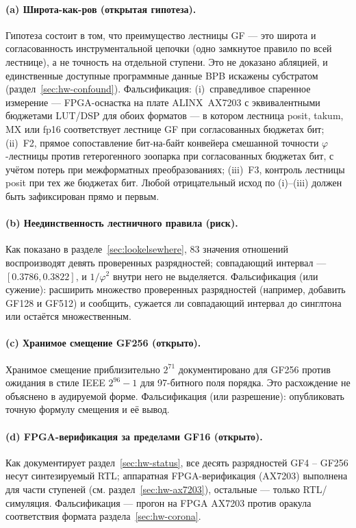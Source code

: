 \documentclass[11pt,a4paper]{article}
\theoremstyle{plain}
\begin{document}
\paragraph{(a) Широта-как-ров (открытая гипотеза).}
Гипотеза состоит в том, что преимущество лестницы GF --- это широта и
согласованность инструментальной цепочки (одно замкнутое правило по всей
лестнице), а не точность на отдельной ступени. Это не доказано абляцией, и
единственные доступные программные данные BPB искажены субстратом
(раздел~\ref{sec:hw-confound}). Фальсификация:
(i)~справедливое спаренное измерение ---
FPGA-оснастка на плате ALINX~AX7203 с эквивалентными бюджетами LUT/DSP для обоих форматов --- в котором
лестница posit, takum, MX или fp16 соответствует лестнице GF при согласованных
бюджетах бит;
(ii)~F2, прямое сопоставление бит-на-байт конвейера смешанной точности
\(\varphi\)-лестницы против гетерогенного зоопарка при согласованных бюджетах
бит, с учётом потерь при межформатных преобразованиях;
(iii)~F3, контроль лестницы posit при тех же бюджетах бит.
Любой отрицательный исход по (i)--(iii) должен быть зафиксирован прямо и первым.

\paragraph{(b) Неединственность лестничного правила (риск).}
Как показано в разделе~\ref{sec:lookelsewhere}, 83 значения отношений
воспроизводят девять проверенных разрядностей; совпадающий интервал ---
\([0.3786, 0.3822]\), и \(1/\varphi^{2}\) внутри него не выделяется.
Фальсификация (или сужение): расширить множество проверенных разрядностей
(например, добавить GF128 и GF512) и сообщить, сужается ли совпадающий интервал
до синглтона или остаётся множественным.

\paragraph{(c) Хранимое смещение GF256 (открыто).}
Хранимое смещение приблизительно \(2^{71}\) документировано для GF256 против
ожидания в стиле IEEE \(2^{96}-1\) для 97-битного поля порядка. Это
расхождение не объяснено в аудируемой форме. Фальсификация (или разрешение):
опубликовать точную формулу смещения и её вывод.

\paragraph{(d) FPGA-верификация за пределами GF16 (открыто).}
Как документирует раздел~\ref{sec:hw-status}, все десять разрядностей GF4 --
GF256 несут синтезируемый RTL; аппаратная FPGA-верификация (AX7203) выполнена
для части ступеней (см. раздел~\ref{sec:hw-ax7203}), остальные --- только RTL/симуляция.
Фальсификация --- прогон на FPGA AX7203 против оракула соответствия формата
раздела~\ref{sec:hw-corona}.
\end{document}

